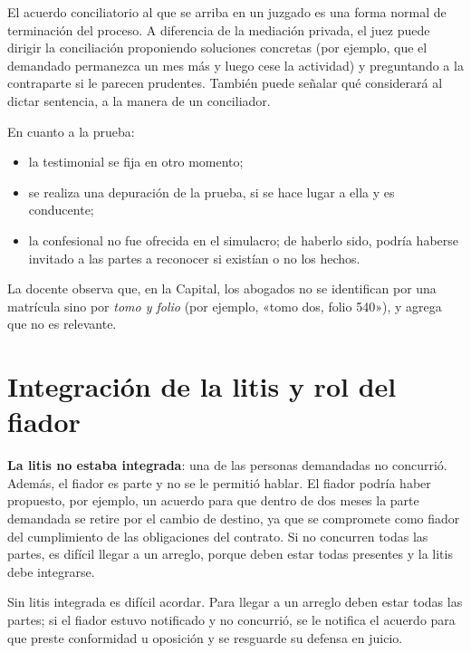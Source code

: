 \documentclass[12pt,oneside]{book}
\begin{document}
El acuerdo conciliatorio al que se arriba en un juzgado es una forma normal de terminación del proceso. A diferencia de la mediación privada, el juez puede dirigir la conciliación proponiendo soluciones concretas (por ejemplo, que el demandado permanezca un mes más y luego cese la actividad) y preguntando a la contraparte si le parecen prudentes. También puede señalar qué considerará al dictar sentencia, a la manera de un conciliador.

En cuanto a la prueba:

\begin{itemize}
    \item la testimonial se fija en otro momento;
    \item se realiza una depuración de la prueba, si se hace lugar a ella y es conducente;
    \item la confesional no fue ofrecida en el simulacro; de haberlo sido, podría haberse invitado a las partes a reconocer si existían o no los hechos.
\end{itemize}

\begin{note}
La docente observa que, en la Capital, los abogados no se identifican por una matrícula sino por \textit{tomo y folio} (por ejemplo, «tomo dos, folio 540»), y agrega que no es relevante.
\end{note}

\section{Integración de la litis y rol del fiador}

\textbf{La litis no estaba integrada}: una de las personas demandadas no concurrió. Además, el fiador es parte y no se le permitió hablar. El fiador podría haber propuesto, por ejemplo, un acuerdo para que dentro de dos meses la parte demandada se retire por el cambio de destino, ya que se compromete como fiador del cumplimiento de las obligaciones del contrato. Si no concurren todas las partes, es difícil llegar a un arreglo, porque deben estar todas presentes y la litis debe integrarse.

\begin{important}
Sin litis integrada es difícil acordar. Para llegar a un arreglo deben estar todas las partes; si el fiador estuvo notificado y no concurrió, se le notifica el acuerdo para que preste conformidad u oposición y se resguarde su defensa en juicio.
\end{important}
\end{document}
